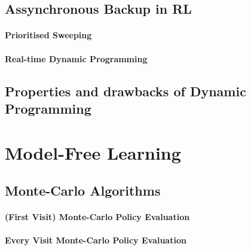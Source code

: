 	\subsection{Assynchronous Backup in RL} %
		\label{sub:assynchronous_backup_in_rl}
		
		\paragraph{Prioritised Sweeping} %
			\label{par:prioritised_sweeping}
		

		\paragraph{Real-time Dynamic Programming} %
			\label{par:real_time_dynamic_programming}
		

	
	\subsection{Properties and drawbacks of Dynamic Programming} %
		\label{sub:properties_and_drawbacks_of_dynamic_programming}
	


\section{Model-Free Learning} %
	\label{sec:model_free_learning}

	\subsection{Monte-Carlo Algorithms} %
		\label{sub:monte_carlo_algorithm}

		\paragraph*{(First Visit) Monte-Carlo Policy Evaluation}

		\paragraph*{Every Visit Monte-Carlo Policy Evaluation}

